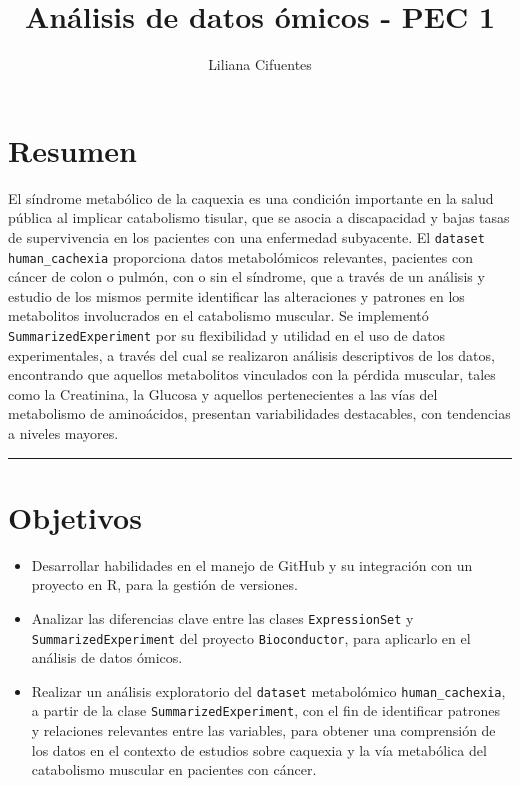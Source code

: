\documentclass[
]{article}
\title{Análisis de datos ómicos - PEC 1}
\author{Liliana Cifuentes}
\date{}
\begin{document}
\maketitle

{
\setcounter{tocdepth}{2}
\tableofcontents
}
\section{Resumen}\label{resumen}

El síndrome metabólico de la caquexia es una condición importante en la
salud pública al implicar catabolismo tisular, que se asocia a
discapacidad y bajas tasas de supervivencia en los pacientes con una
enfermedad subyacente. El \texttt{dataset} \texttt{human\_cachexia}
proporciona datos metabolómicos relevantes, pacientes con cáncer de
colon o pulmón, con o sin el síndrome, que a través de un análisis y
estudio de los mismos permite identificar las alteraciones y patrones en
los metabolitos involucrados en el catabolismo muscular. Se implementó
\texttt{SummarizedExperiment} por su flexibilidad y utilidad en el uso
de datos experimentales, a través del cual se realizaron análisis
descriptivos de los datos, encontrando que aquellos metabolitos
vinculados con la pérdida muscular, tales como la Creatinina, la Glucosa
y aquellos pertenecientes a las vías del metabolismo de aminoácidos,
presentan variabilidades destacables, con tendencias a niveles mayores.

\begin{center}\rule{0.5\linewidth}{0.5pt}\end{center}

\section{Objetivos}\label{objetivos}

\begin{itemize}
\item
  Desarrollar habilidades en el manejo de GitHub y su integración con un
  proyecto en R, para la gestión de versiones.
\item
  Analizar las diferencias clave entre las clases \texttt{ExpressionSet}
  y \texttt{SummarizedExperiment} del proyecto \texttt{Bioconductor},
  para aplicarlo en el análisis de datos ómicos.
\item
  Realizar un análisis exploratorio del \texttt{dataset} metabolómico
  \texttt{human\_cachexia}, a partir de la clase
  \texttt{SummarizedExperiment}, con el fin de identificar patrones y
  relaciones relevantes entre las variables, para obtener una
  comprensión de los datos en el contexto de estudios sobre caquexia y
  la vía metabólica del catabolismo muscular en pacientes con cáncer.
\end{itemize}
\end{document}
